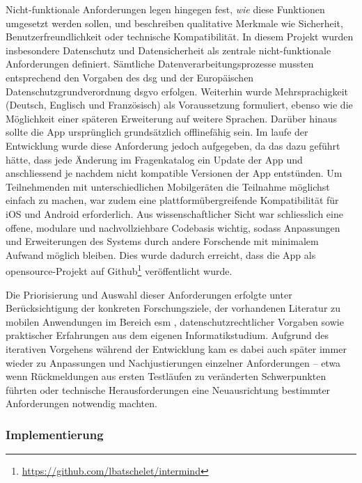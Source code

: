 Nicht-funktionale Anforderungen legen hingegen fest, \textit{wie} diese Funktionen umgesetzt werden sollen, und beschreiben qualitative Merkmale wie Sicherheit, Benutzerfreundlichkeit oder technische Kompatibilität. In diesem Projekt wurden insbesondere Datenschutz und Datensicherheit als zentrale nicht-funktionale Anforderungen definiert. Sämtliche Datenverarbeitungsprozesse mussten entsprechend den Vorgaben des \acrfull{dsg} und der Europäischen Datenschutzgrundverordnung \acrshort{dsgvo} erfolgen. Weiterhin wurde Mehrsprachigkeit (Deutsch, Englisch und Französisch) als Voraussetzung formuliert, ebenso wie die Möglichkeit einer späteren Erweiterung auf weitere Sprachen. Darüber hinaus sollte die App ursprünglich grundsätzlich offlinefähig sein. Im laufe der Entwicklung wurde diese Anforderung jedoch aufgegeben, da das dazu geführt hätte, dass jede Änderung im Fragenkatalog ein Update der App und anschliessend je nachdem nicht kompatible Versionen der App entstünden. Um Teilnehmenden mit unterschiedlichen Mobilgeräten die Teilnahme möglichst einfach zu machen, war zudem eine plattformübergreifende Kompatibilität für iOS und Android erforderlich. Aus wissenschaftlicher Sicht war schliesslich eine offene, modulare und nachvollziehbare Codebasis wichtig, sodass Anpassungen und Erweiterungen des Systems durch andere Forschende mit minimalem Aufwand möglich bleiben. Dies wurde dadurch erreicht, dass die App als \gls{opensource}-Projekt auf Github\footnote{\href{https://github.com/lbatschelet/intermind}{https://github.com/lbatschelet/intermind}} veröffentlicht wurde.

Die Priorisierung und Auswahl dieser Anforderungen erfolgte unter Berücksichtigung der konkreten Forschungsziele, der vorhandenen Literatur zu mobilen Anwendungen im Bereich \gls{esm} \parencite{chenPerceivedUrbanEnvironment2025, randallDevelopmentTrialMobile2013}, datenschutzrechtlicher Vorgaben sowie praktischer Erfahrungen aus dem eigenen Informatikstudium. Aufgrund des iterativen Vorgehens während der Entwicklung kam es dabei auch später immer wieder zu Anpassungen und Nachjustierungen einzelner Anforderungen – etwa wenn Rückmeldungen aus ersten Testläufen zu veränderten Schwerpunkten führten oder technische Herausforderungen eine Neuausrichtung bestimmter Anforderungen notwendig machten.

\subsubsection{Implementierung}

